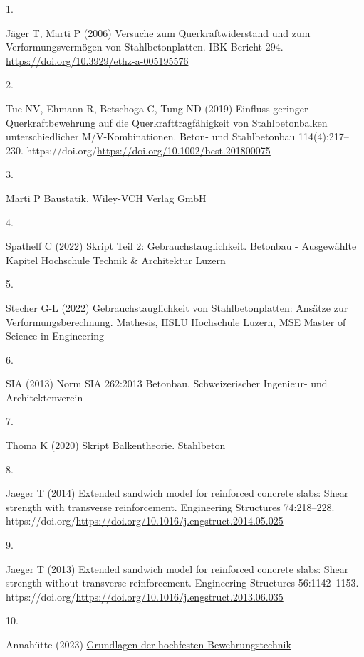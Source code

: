\documentclass[
  12pt,
  letterpaper,
  egregdoesnotlikesansseriftitles]{scrreprt}
\newlength{\cslhangindent}
\newlength{\csllabelwidth}
\newlength{\cslentryspacingunit} %
\newenvironment{CSLReferences}[2] %
 {%
  \setlength{\parindent}{0pt}
  \ifodd #1
  \let\oldpar\par
  \def\par{\hangindent=\cslhangindent\oldpar}
  \fi
  \setlength{\parskip}{#2\cslentryspacingunit}
 }%
 {}
\newcommand{\CSLLeftMargin}[1]{\parbox[t]{\csllabelwidth}{#1}}
\newcommand{\CSLRightInline}[1]{\parbox[t]{\linewidth - \csllabelwidth}{#1}\break}
\begin{document}
\hypertarget{refs}{}
\begin{CSLReferences}{0}{0}
\leavevmode{}%
\CSLLeftMargin{1. }%
\CSLRightInline{Jäger T, Marti P (2006) Versuche zum
{Querkraftwiderstand} und zum {Verformungsvermögen} von
{Stahlbetonplatten}. IBK Bericht 294.
\url{https://doi.org/10.3929/ethz-a-005195576}}

\leavevmode{}%
\CSLLeftMargin{2. }%
\CSLRightInline{Tue NV, Ehmann R, Betschoga C, Tung ND (2019) Einfluss
geringer Querkraftbewehrung auf die Querkrafttragfähigkeit von
Stahlbetonbalken unterschiedlicher M/V-Kombinationen. Beton- und
Stahlbetonbau 114(4):217--230.
https://doi.org/\url{https://doi.org/10.1002/best.201800075}}

\leavevmode{}%
\CSLLeftMargin{3. }%
\CSLRightInline{Marti P Baustatik. Wiley-VCH Verlag GmbH}

\leavevmode{}%
\CSLLeftMargin{4. }%
\CSLRightInline{Spathelf C (2022) Skript Teil 2: Gebrauchstauglichkeit.
Betonbau - Ausgewählte Kapitel Hochschule Technik \& Architektur Luzern}

\leavevmode{}%
\CSLLeftMargin{5. }%
\CSLRightInline{Stecher G-L (2022) Gebrauchstauglichkeit von
Stahlbetonplatten: Ansätze zur Verformungsberechnung. Mathesis, HSLU
Hochschule Luzern, MSE Master of Science in Engineering}

\leavevmode{}%
\CSLLeftMargin{6. }%
\CSLRightInline{SIA (2013) Norm {SIA} 262:2013 {Betonbau}.
{Schweizerischer Ingenieur- und Architektenverein}}

\leavevmode{}%
\CSLLeftMargin{7. }%
\CSLRightInline{Thoma K (2020) Skript Balkentheorie. Stahlbeton}

\leavevmode{}%
\CSLLeftMargin{8. }%
\CSLRightInline{Jaeger T (2014) Extended sandwich model for reinforced
concrete slabs: Shear strength with transverse reinforcement.
Engineering Structures 74:218--228.
https://doi.org/\url{https://doi.org/10.1016/j.engstruct.2014.05.025}}

\leavevmode{}%
\CSLLeftMargin{9. }%
\CSLRightInline{Jaeger T (2013) Extended sandwich model for reinforced
concrete slabs: Shear strength without transverse reinforcement.
Engineering Structures 56:1142--1153.
https://doi.org/\url{https://doi.org/10.1016/j.engstruct.2013.06.035}}

\leavevmode{}%
\CSLLeftMargin{10. }%
\CSLRightInline{Annahütte (2023)
\href{https://www.annahuette.com/cdn/uploads/bro-sas-670-reinforcement-de-en-02-2016-web.pdf}{Grundlagen
der hochfesten Bewehrungstechnik}}

\end{CSLReferences}
\end{document}
